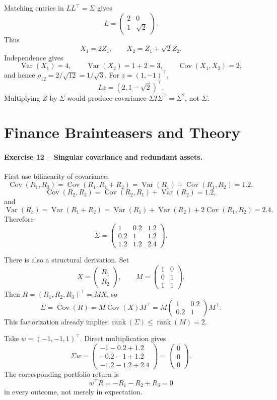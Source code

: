 \documentclass[10pt]{article}
\newcommand{\R}{\mathbb{R}}
\newcommand{\Var}{\operatorname{Var}}
\newcommand{\Cov}{\operatorname{Cov}}
\newcommand{\rank}{\operatorname{rank}}
\begin{document}
Matching entries in $LL^\top=\Sigma$ gives
\[
L=\begin{pmatrix}2&0\\1&\sqrt2\end{pmatrix}.
\]
Thus
\[
X_1=2Z_1,\qquad X_2=Z_1+\sqrt2Z_2.
\]
Independence gives
\[
\Var(X_1)=4,\qquad \Var(X_2)=1+2=3,
\qquad \Cov(X_1,X_2)=2,
\]
and hence $\rho_{12}=2/\sqrt{12}=1/\sqrt3$. For $z=(1,-1)^\top$,
\[
Lz=(2,1-\sqrt2)^\top.
\]
Multiplying $Z$ by $\Sigma$ would produce covariance
$\Sigma I\Sigma^\top=\Sigma^2$, not $\Sigma$.

\section{Finance Brainteasers and Theory}

\paragraph{Exercise 12 -- Singular covariance and redundant assets.}

First use bilinearity of covariance:
\[
\Cov(R_1,R_3)=\Cov(R_1,R_1+R_2)
=\Var(R_1)+\Cov(R_1,R_2)=1.2,
\]
\[
\Cov(R_2,R_3)=\Cov(R_2,R_1)+\Var(R_2)=1.2,
\]
and
\[
\Var(R_3)=\Var(R_1+R_2)
=\Var(R_1)+\Var(R_2)+2\Cov(R_1,R_2)=2.4.
\]
Therefore
\[
\Sigma=\begin{pmatrix}
1&0.2&1.2\\0.2&1&1.2\\1.2&1.2&2.4
\end{pmatrix}.
\]

There is also a structural derivation. Set
\[
X=\begin{pmatrix}R_1\\R_2\end{pmatrix},\qquad
M=\begin{pmatrix}1&0\\0&1\\1&1\end{pmatrix}.
\]
Then $R=(R_1,R_2,R_3)^\top=MX$, so
\[
\Sigma=\Cov(R)=M\Cov(X)M^\top
=M\begin{pmatrix}1&0.2\\0.2&1\end{pmatrix}M^\top.
\]
This factorization already implies $\rank(\Sigma)\le\rank(M)=2$.

Take $w=(-1,-1,1)^\top$. Direct multiplication gives
\[
\Sigma w=
\begin{pmatrix}
-1-0.2+1.2\\-0.2-1+1.2\\-1.2-1.2+2.4
\end{pmatrix}
=\begin{pmatrix}0\\0\\0\end{pmatrix}.
\]
The corresponding portfolio return is
\[
w^\top R=-R_1-R_2+R_3=0
\]
in every outcome, not merely in expectation.
\end{document}
